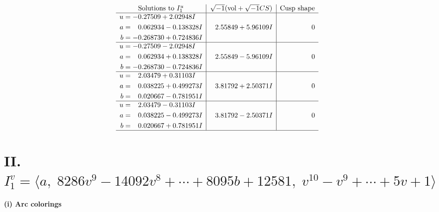 \documentclass[1p]{elsarticle_modified}
\theoremstyle{definition}
\newcommand{\I}{\sqrt{-1}}
\begin{document}
$$\begin{array}{c|c|c}
\text{Solutions to }I^u_{1}& \I (\text{vol} + \sqrt{-1}CS) & \text{Cusp shape}\\
 \hline 
\begin{aligned}
u &= -0.27509 + 2.02948 I \\
a &= \phantom{-}0.062934 - 0.138328 I \\
b &= -0.268730 + 0.724836 I\end{aligned}
 & \phantom{-}2.55849 + 5.96109 I & \phantom{-0.000000 } 0 \\ \hline\begin{aligned}
u &= -0.27509 - 2.02948 I \\
a &= \phantom{-}0.062934 + 0.138328 I \\
b &= -0.268730 - 0.724836 I\end{aligned}
 & \phantom{-}2.55849 - 5.96109 I & \phantom{-0.000000 } 0 \\ \hline\begin{aligned}
u &= \phantom{-}2.03479 + 0.31103 I \\
a &= \phantom{-}0.038225 + 0.499273 I \\
b &= \phantom{-}0.020667 - 0.781951 I\end{aligned}
 & \phantom{-}3.81792 + 2.50371 I & \phantom{-0.000000 } 0 \\ \hline\begin{aligned}
u &= \phantom{-}2.03479 - 0.31103 I \\
a &= \phantom{-}0.038225 - 0.499273 I \\
b &= \phantom{-}0.020667 + 0.781951 I\end{aligned}
 & \phantom{-}3.81792 - 2.50371 I & \phantom{-0.000000 } 0\\
 \hline 
 \end{array}$$\newpage\newpage\renewcommand{\arraystretch}{1}
\centering \section*{II. $I^v_{1}= \langle a,\;8286 v^9-14092 v^8+\cdots+8095 b+12581,\;v^{10}- v^9+\cdots+5 v+1 \rangle$}
\flushleft \textbf{(i) Arc colorings}\\
\end{document}
